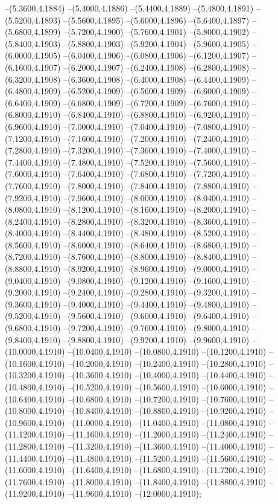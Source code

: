 {	--(5.3600,4.1884)
	--(5.4000,4.1886)
	--(5.4400,4.1889)
	--(5.4800,4.1891)
	--(5.5200,4.1893)
	--(5.5600,4.1895)
	--(5.6000,4.1896)
	--(5.6400,4.1897)
	--(5.6800,4.1899)
	--(5.7200,4.1900)
	--(5.7600,4.1901)
	--(5.8000,4.1902)
	--(5.8400,4.1903)
	--(5.8800,4.1903)
	--(5.9200,4.1904)
	--(5.9600,4.1905)
	--(6.0000,4.1905)
	--(6.0400,4.1906)
	--(6.0800,4.1906)
	--(6.1200,4.1907)
	--(6.1600,4.1907)
	--(6.2000,4.1907)
	--(6.2400,4.1908)
	--(6.2800,4.1908)
	--(6.3200,4.1908)
	--(6.3600,4.1908)
	--(6.4000,4.1908)
	--(6.4400,4.1909)
	--(6.4800,4.1909)
	--(6.5200,4.1909)
	--(6.5600,4.1909)
	--(6.6000,4.1909)
	--(6.6400,4.1909)
	--(6.6800,4.1909)
	--(6.7200,4.1909)
	--(6.7600,4.1910)
	--(6.8000,4.1910)
	--(6.8400,4.1910)
	--(6.8800,4.1910)
	--(6.9200,4.1910)
	--(6.9600,4.1910)
	--(7.0000,4.1910)
	--(7.0400,4.1910)
	--(7.0800,4.1910)
	--(7.1200,4.1910)
	--(7.1600,4.1910)
	--(7.2000,4.1910)
	--(7.2400,4.1910)
	--(7.2800,4.1910)
	--(7.3200,4.1910)
	--(7.3600,4.1910)
	--(7.4000,4.1910)
	--(7.4400,4.1910)
	--(7.4800,4.1910)
	--(7.5200,4.1910)
	--(7.5600,4.1910)
	--(7.6000,4.1910)
	--(7.6400,4.1910)
	--(7.6800,4.1910)
	--(7.7200,4.1910)
	--(7.7600,4.1910)
	--(7.8000,4.1910)
	--(7.8400,4.1910)
	--(7.8800,4.1910)
	--(7.9200,4.1910)
	--(7.9600,4.1910)
	--(8.0000,4.1910)
	--(8.0400,4.1910)
	--(8.0800,4.1910)
	--(8.1200,4.1910)
	--(8.1600,4.1910)
	--(8.2000,4.1910)
	--(8.2400,4.1910)
	--(8.2800,4.1910)
	--(8.3200,4.1910)
	--(8.3600,4.1910)
	--(8.4000,4.1910)
	--(8.4400,4.1910)
	--(8.4800,4.1910)
	--(8.5200,4.1910)
	--(8.5600,4.1910)
	--(8.6000,4.1910)
	--(8.6400,4.1910)
	--(8.6800,4.1910)
	--(8.7200,4.1910)
	--(8.7600,4.1910)
	--(8.8000,4.1910)
	--(8.8400,4.1910)
	--(8.8800,4.1910)
	--(8.9200,4.1910)
	--(8.9600,4.1910)
	--(9.0000,4.1910)
	--(9.0400,4.1910)
	--(9.0800,4.1910)
	--(9.1200,4.1910)
	--(9.1600,4.1910)
	--(9.2000,4.1910)
	--(9.2400,4.1910)
	--(9.2800,4.1910)
	--(9.3200,4.1910)
	--(9.3600,4.1910)
	--(9.4000,4.1910)
	--(9.4400,4.1910)
	--(9.4800,4.1910)
	--(9.5200,4.1910)
	--(9.5600,4.1910)
	--(9.6000,4.1910)
	--(9.6400,4.1910)
	--(9.6800,4.1910)
	--(9.7200,4.1910)
	--(9.7600,4.1910)
	--(9.8000,4.1910)
	--(9.8400,4.1910)
	--(9.8800,4.1910)
	--(9.9200,4.1910)
	--(9.9600,4.1910)
	--(10.0000,4.1910)
	--(10.0400,4.1910)
	--(10.0800,4.1910)
	--(10.1200,4.1910)
	--(10.1600,4.1910)
	--(10.2000,4.1910)
	--(10.2400,4.1910)
	--(10.2800,4.1910)
	--(10.3200,4.1910)
	--(10.3600,4.1910)
	--(10.4000,4.1910)
	--(10.4400,4.1910)
	--(10.4800,4.1910)
	--(10.5200,4.1910)
	--(10.5600,4.1910)
	--(10.6000,4.1910)
	--(10.6400,4.1910)
	--(10.6800,4.1910)
	--(10.7200,4.1910)
	--(10.7600,4.1910)
	--(10.8000,4.1910)
	--(10.8400,4.1910)
	--(10.8800,4.1910)
	--(10.9200,4.1910)
	--(10.9600,4.1910)
	--(11.0000,4.1910)
	--(11.0400,4.1910)
	--(11.0800,4.1910)
	--(11.1200,4.1910)
	--(11.1600,4.1910)
	--(11.2000,4.1910)
	--(11.2400,4.1910)
	--(11.2800,4.1910)
	--(11.3200,4.1910)
	--(11.3600,4.1910)
	--(11.4000,4.1910)
	--(11.4400,4.1910)
	--(11.4800,4.1910)
	--(11.5200,4.1910)
	--(11.5600,4.1910)
	--(11.6000,4.1910)
	--(11.6400,4.1910)
	--(11.6800,4.1910)
	--(11.7200,4.1910)
	--(11.7600,4.1910)
	--(11.8000,4.1910)
	--(11.8400,4.1910)
	--(11.8800,4.1910)
	--(11.9200,4.1910)
	--(11.9600,4.1910)
	--(12.0000,4.1910);
}
